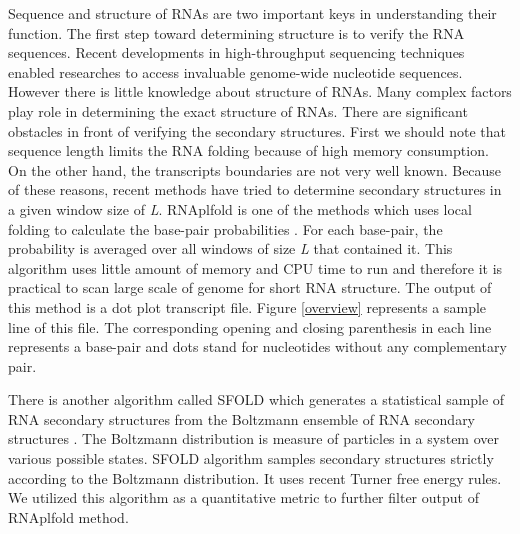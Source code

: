 Sequence and structure of RNAs are two important keys in understanding their function. The first step toward determining structure is to verify the RNA sequences. Recent developments in high-throughput sequencing techniques enabled researches to access invaluable genome-wide nucleotide sequences. However there is little knowledge about structure of RNAs. Many complex factors play role in determining the exact structure of RNAs. There are significant obstacles in front of verifying the secondary structures. First we should note that sequence length limits the RNA folding because of high memory consumption. On the other hand, the transcripts boundaries are not very well known. Because of these reasons, recent methods have tried to determine secondary structures in a given window size of \textit{L}. RNAplfold is one of the methods which uses local folding to calculate the base-pair probabilities \cite{RNAplfold}. For each base-pair, the probability is averaged over all windows of size \textit{L} that contained it. This algorithm uses little amount of memory and CPU time to run and therefore it is practical to scan large scale of genome for short RNA structure. The output of this method is a dot plot transcript file. Figure \ref{overview} represents a sample line of this file. The corresponding opening and closing parenthesis in each line represents a base-pair and dots stand for nucleotides without any complementary pair. 

There is another algorithm called SFOLD which generates a statistical sample of RNA secondary structures from the Boltzmann ensemble of RNA secondary structures \cite{sfold}. The Boltzmann distribution is measure of particles in a system over various possible states. SFOLD algorithm samples secondary structures strictly according to the Boltzmann distribution. It uses recent Turner free energy rules. We utilized this algorithm as a quantitative metric to further filter output of RNAplfold method.

